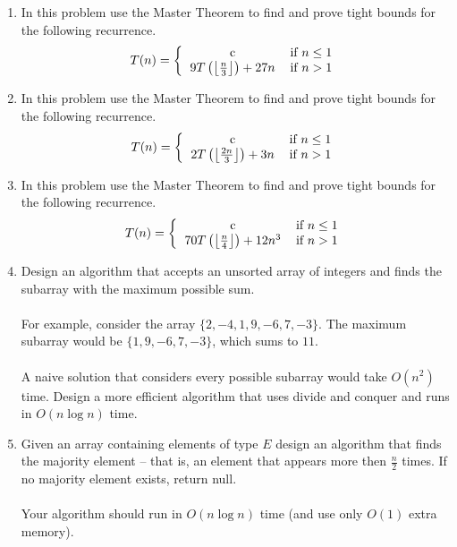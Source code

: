\documentclass[12pt]{article}
\begin{document}
\begin{enumerate}
\item In this problem use the Master Theorem to find and prove tight bounds for the following recurrence.
\[
T(n) = \left\{
\begin{tabular}{cc}
c & \text{if} $n\leq 1$ \\
$9T\left(\left\lfloor\frac{n}{3}\right\rfloor\right)+27n$ & \text{if} $n>1$ \\
\end{tabular}\right.
\]
\newpage
\item In this problem use the Master Theorem to find and prove tight bounds for the following recurrence.
\[
T(n) = \left\{
\begin{tabular}{cc}
c & \text{if} $n\leq 1$ \\
$2T\left(\left\lfloor\frac{2n}{3}\right\rfloor\right)+3n$ & \text{if} $n>1$ \\
\end{tabular}\right.
\]
\newpage
\item In this problem use the Master Theorem to find and prove tight bounds for the following recurrence.
\[
T(n) = \left\{
\begin{tabular}{cc}
c & \text{if} $n\leq 1$ \\
$70T\left(\left\lfloor\frac{n}{4}\right\rfloor\right)+12n^3$ & \text{if} $n>1$ \\
\end{tabular}\right.
\]
\newpage
\item Design an algorithm that accepts an unsorted array of integers and finds the subarray with the maximum
possible sum.\\\\
For example, consider the array $\{2, -4, 1, 9, -6, 7, -3\}$. The maximum subarray would be $\{1, 9, -6, 7, -3\}$, which sums to $11$.\\\\
A naive solution that considers every possible subarray would take $O(n^2)$ time. Design a more efficient
algorithm that uses divide and conquer and runs in $O (n \log{n})$ time.
\newpage
\item  Given an array containing elements of type $E$ design an algorithm that finds the majority element – that is,
an element that appears more then $\frac{n}{2}$ times. If no majority element exists, return null.\\\\
Your algorithm should run in $O (n \log{n})$ time (and use only $O (1)$ extra memory).\\\\

\end{enumerate}
\end{document}
